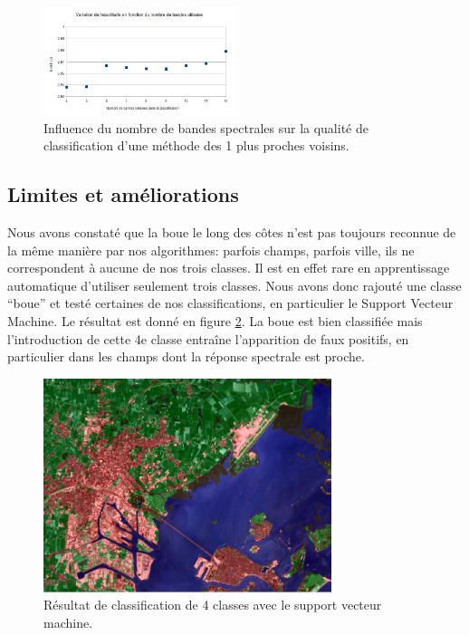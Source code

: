\documentclass[a4paper,10pt]{report}
\begin{document}
\begin{figure}[H]
  \centering
    \includegraphics[width=0.5\textwidth]{nb_bands}
  \caption{Influence du nombre de bandes spectrales sur la qualité de classification d'une méthode des 1 plus proches voisins.}
  \label{fig:nBandes}
\end{figure}

\subsection{Limites et améliorations}
Nous avons constaté que la boue le long des côtes n'est pas toujours reconnue de la même manière par nos algorithmes: parfois champs, parfois ville, ils ne correspondent à aucune de nos trois classes. Il est en effet rare en apprentissage automatique d'utiliser seulement trois classes. Nous avons donc rajouté une classe ``boue'' et testé certaines de nos classifications, en particulier le Support Vecteur Machine. Le résultat est donné en figure \ref{fig:SVM4Cl}. La boue est bien classifiée mais l'introduction de cette 4e classe entraîne l'apparition de faux positifs, en particulier dans les champs dont la réponse spectrale est proche.
\begin{figure}[H]
  \centering
    \includegraphics[width=0.75\textwidth]{SVM4Classes}
  \caption{Résultat de classification de 4 classes avec le support vecteur machine.}
  \label{fig:SVM4Cl}
\end{figure}
\end{document}
